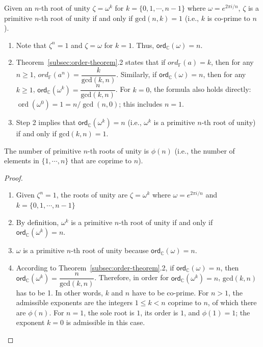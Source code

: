 \begin{tcolorbox}[title={\textbf{\tboxtheorem{\ref*{subsec:roots-theorem}.4} Condition for Primitive $\bm{n}$-th Roots of Unity}}]
Given an $n$-th root of unity $\zeta = \omega^k$ for $k = \{0, 1, \cdots, n-1\}$ where $\omega = e^{2\pi i/n}$, $\zeta$ is a primitive $n$-th root of unity if and only if $\text{gcd}(n, k) = 1$ (i.e., $k$ is co-prime to $n$).
\end{tcolorbox}
\begin{myproof}
    \begin{enumerate}
    \item Note that $\zeta^n = 1$ and $\zeta = \omega$ for $k = 1$. Thus, $\textsf{ord}_{\mathbb{C}}(\omega) = n$.
    \item Theorem~\ref*{subsec:order-theorem}.2 states that if $ord_{\mathbb{F}}(a) = k$, then for any $n \geq 1$, $ord_{\mathbb{F}}(a^n) = \dfrac{k}{\text{gcd}(k,n)}$. Similarly, if $\textsf{ord}_{\mathbb{C}}(\omega) = n$, then for any $k \geq 1$, $\textsf{ord}_{\mathbb{C}}(\omega^k) = \dfrac{n}{\text{gcd}(k, n)}$. For $k=0$, the formula also holds directly: $\operatorname{ord}(\omega^0)=1=n/\gcd(n,0)$; this includes $n=1$.
    \item Step 2 implies that $\textsf{ord}_{\mathbb{C}}(\omega^k) = n$ (i.e., $\omega^k$ is a primitive $n$-th root of unity) if and only if $\text{gcd}(k, n) = 1$.
    \end{enumerate}
\end{myproof}

\begin{tcolorbox}[title={\textbf{\tboxtheorem{\ref*{subsec:roots-theorem}.5} The number of Primitive $\bm{n}$-th Roots of Unity}}]
The number of primitive $n$-th roots of unity is $\phi(n)$ (i.e., the number of elements in $\{1, \cdots, n \}$ that are coprime to $n$).
\end{tcolorbox}

\begin{proof}
$ $
\begin{enumerate}
\item Given $\zeta^n = 1$, the roots of unity are $\zeta = \omega^k$ where $\omega = e^{2\pi i/n}$ and $k = \{0, 1, \cdots, n-1\}$ 
\item By definition, $\omega^k$ is a primitive $n$-th root of unity if and only if $\textsf{ord}_{\mathbb{C}}(\omega^k) = n$. 
\item $\omega$ is a primitive $n$-th root of unity because $\textsf{ord}_{\mathbb{C}}(\omega) = n$. 
\item According to Theorem~\ref*{subsec:order-theorem}.2, if $\textsf{ord}_{\mathbb{C}}(\omega) = n$, then $\textsf{ord}_{\mathbb{C}}(\omega^k) = \dfrac{n}{\text{gcd}(k,n)}$. Therefore, in order for $\textsf{ord}_{\mathbb{C}}(\omega^k) = n$, $\text{gcd}(k,n)$ has to be 1. In other words, $k$ and $n$ have to be co-prime.
For $n>1$, the admissible exponents are the integers $1\le k<n$ coprime to $n$, of which there are $\phi(n)$. For $n=1$, the sole root is $1$, its order is $1$, and $\phi(1)=1$; the exponent $k=0$ is admissible in this case.
\end{enumerate}
\end{proof}
